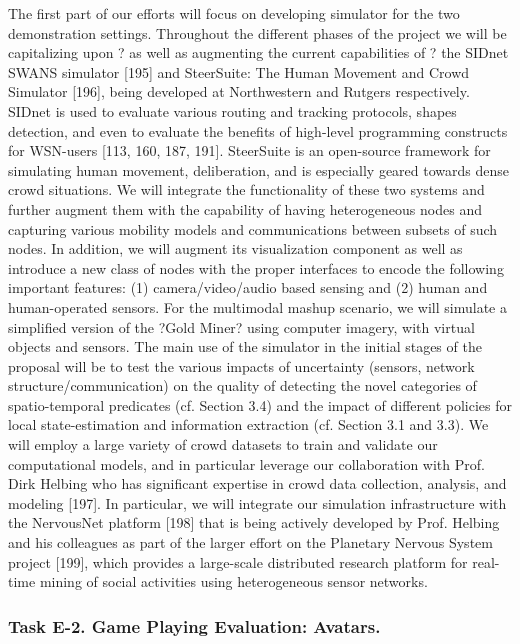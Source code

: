 The first part of our efforts will focus on developing simulator for the two demonstration settings. Throughout the different phases of the project we will be capitalizing upon ? as well as augmenting the current capabilities of ? the SIDnet SWANS simulator [195] and SteerSuite: The Human Movement and Crowd Simulator [196], being developed at Northwestern and Rutgers respectively. SIDnet is used to evaluate various routing and tracking protocols, shapes detection, and even to evaluate the benefits of high-level programming constructs for WSN-users [113, 160, 187, 191]. SteerSuite is an open-source framework for simulating human movement, deliberation, and is especially geared towards dense crowd situations. We will integrate the functionality of these two systems and further augment them with the capability of having heterogeneous nodes and capturing various mobility models and communications between subsets of such nodes. In addition, we will augment its visualization component as well as introduce a new class of nodes with the proper interfaces to encode the following important features: (1) camera/video/audio based sensing and (2) human and human-operated sensors.  For the multimodal mashup scenario, we will simulate a simplified version of the ?Gold Miner? using computer imagery, with virtual objects and sensors. 
The main use of the simulator in the initial stages of the proposal will be to test the various impacts of uncertainty (sensors, network structure/communication) on the quality of detecting the novel categories of spatio-temporal predicates (cf. Section 3.4) and the impact of different policies for local state-estimation and information extraction (cf. Section 3.1 and 3.3). We will employ a large variety of crowd datasets to train and validate our computational models, and in particular leverage our collaboration with Prof. Dirk Helbing who has significant expertise in crowd data collection, analysis, and modeling [197].  In particular, we will integrate our simulation infrastructure with the NervousNet platform [198] that is being actively developed by Prof. Helbing and his colleagues as part of the larger effort on the Planetary Nervous System project [199], which provides a large-scale distributed research platform for real-time mining of social activities using heterogeneous sensor networks.


\subsubsection{Task E-2. Game Playing Evaluation: Avatars. }

